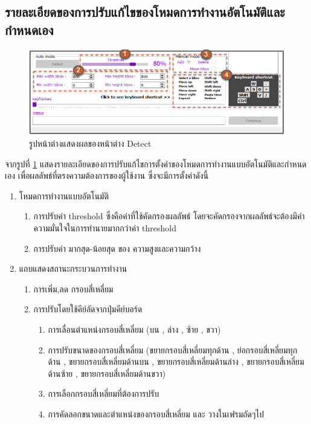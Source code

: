 \subsection*{รายละเอียดของการปรับแก้ไขของโหมดการทำงานอัตโนมัติและกำหนดเอง}
\begin{figure}[!ht]
  \centering
    \includegraphics[scale=1]{chapter4/images/New_Final_ui/ex_detect.png}
    \caption{รูปหน้าต่างแสดงผลของหน้าต่าง Detect}
    \label{fig:ex_detect}
\end{figure}
จากรูปที่ \ref{fig:ex_detect} แสดงรายละเอียดของการปรับแก้ไขการตั้งค่าของโหมดการทำงานแบบอัตโนมัติและกำหนดเอง เพื่อผลลัพธ์ที่ตรงความต้องการของผู้ใช้งาน ซึ่งจะมีการตั้งค่าดังนี้
\begin{enumerate}
	\item โหมดการทำงานแบบอัตโนมัติ
	\begin{enumerate}
		\item การปรับค่า threshold ซึ่งคือค่าที่ใช้คัดกรองผลลัพธ์ โดยจะคัดกรองจากผลลัพธ์จะต้องมีค่าความมั่นใจในการทำนายมากกว่าค่า threshold
		\item การปรับค่า มากสุด-น้อยสุด ของ ความสูงและความกว้าง
	\end{enumerate}	
	\item แถบแสดงสถานะกระบวนการทำงาน
	\begin{enumerate}
		\item การเพิ่ม,ลด กรอบสี่เหลี่ยม
		\item การปรับโดยใช้คีย์ลัดจากปุ่มคีย์บอร์ด
		\begin{enumerate}
			\item การเลื่อนตำแหน่งกรอบสี่เหลี่ยม (บน , ล่าง , ซ้าย , ขวา)
			\item การปรับขนาดของกรอบสี่เหลี่ยม (ขยายกรอบสี่เหลี่ยมทุกด้าน , ย่อกรอบสี่เหลี่ยมทุกด้าน , ขยายกรอบสี่เหลี่ยมด้านบน , ขยายกรอบสี่เหลี่ยมด้านล่าง , ขยายกรอบสี่เหลี่ยมด้านซ้าย , ขยายกรอบสี่เหลี่ยมด้านขวา)
			\item การเลือกกรอบสี่เหลี่ยมที่ต้องการปรับ
			\item การคัดลอกขนาดและตำแหน่งของกรอบสี่เหลี่ยม และ วางในเฟรมถัดๆไป
		\end{enumerate}	
	\end{enumerate}	
\end{enumerate}	



